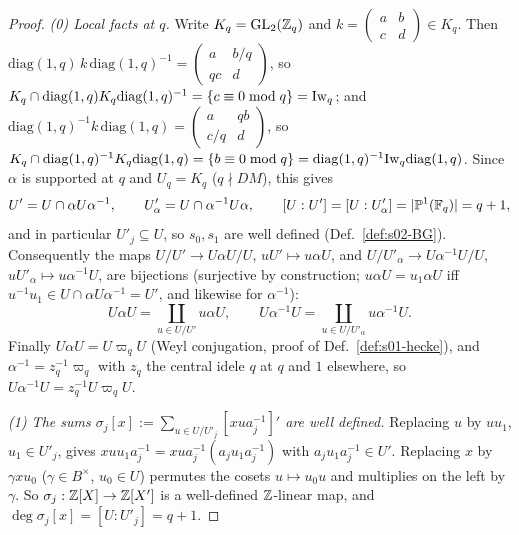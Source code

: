 \begin{proof}
\emph{(0) Local facts at $q$.} Write $K_q=\mathrm{GL}_2(\mathbb{Z}_q)$ and $k=\left(\begin{smallmatrix}a&b\\c&d\end{smallmatrix}\right)\in K_q$. Then
$\mathrm{diag}(1,q)\,k\,\mathrm{diag}(1,q)^{-1}=\left(\begin{smallmatrix}a&b/q\\qc&d\end{smallmatrix}\right)$, so $K_q\cap\mathrm{diag}(1,q)K_q\mathrm{diag}(1,q)^{-1}=\{c\equiv0\bmod q\}=\mathrm{Iw}_q$; and
$\mathrm{diag}(1,q)^{-1}k\,\mathrm{diag}(1,q)=\left(\begin{smallmatrix}a&qb\\c/q&d\end{smallmatrix}\right)$, so $K_q\cap\mathrm{diag}(1,q)^{-1}K_q\mathrm{diag}(1,q)=\{b\equiv0\bmod q\}
=\mathrm{diag}(1,q)^{-1}\mathrm{Iw}_q\mathrm{diag}(1,q)$. Since $\alpha$ is supported at $q$ and $U_q=K_q$ ($q\nmid DM$), this gives
\[U'=U\cap\alpha U\alpha^{-1},\qquad U'_\alpha=U\cap\alpha^{-1}U\alpha,\qquad [U:U']=[U:U'_\alpha]=|\mathbb P^1(\mathbb{F}_q)|=q+1,\]
and in particular $U'_j\subseteq U$, so $s_0,s_1$ are well defined (Def.~\ref{def:s02-BG}). Consequently the maps $U/U'\to U\alpha U/U$, $uU'\mapsto u\alpha U$, and
$U/U'_\alpha\to U\alpha^{-1}U/U$, $uU'_\alpha\mapsto u\alpha^{-1}U$, are bijections (surjective by construction; $u\alpha U=u_1\alpha U$ iff
$u^{-1}u_1\in U\cap\alpha U\alpha^{-1}=U'$, and likewise for $\alpha^{-1}$):
\[U\alpha U=\coprod_{u\in U/U'}u\alpha U,\qquad U\alpha^{-1}U=\coprod_{u\in U/U'_\alpha}u\alpha^{-1}U .\]
Finally $U\alpha U=U\varpi_qU$ (Weyl conjugation, proof of Def.~\ref{def:s01-hecke}), and $\alpha^{-1}=z_q^{-1}\varpi_q$ with $z_q$ the central idele $q$ at $q$
and $1$ elsewhere, so $U\alpha^{-1}U=z_q^{-1}U\varpi_qU$.

\emph{(1) The sums $\sigma_j[x]:=\sum_{u\in U/U'_j}[xua_j^{-1}]'$ are well defined.} Replacing $u$ by $uu_1$, $u_1\in U'_j$, gives
$xuu_1a_j^{-1}=xua_j^{-1}(a_ju_1a_j^{-1})$ with $a_ju_1a_j^{-1}\in U'$. Replacing $x$ by $\gamma xu_0$ ($\gamma\in B^\times$, $u_0\in U$) permutes the cosets
$u\mapsto u_0u$ and multiplies on the left by $\gamma$. So $\sigma_j:\mathbb{Z}[X]\to\mathbb{Z}[X']$ is a well-defined $\mathbb{Z}$-linear map, and $\deg\sigma_j[x]=[U:U'_j]=q+1$.


\end{proof}

